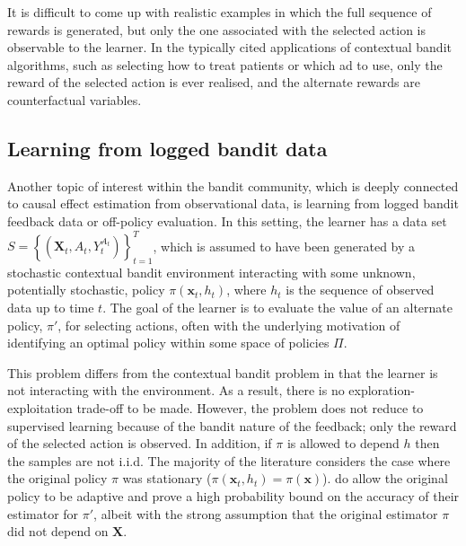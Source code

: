 \documentclass[11pt,a4paper,twoside]{report}
\newcommand{\set}[1]{\left\{#1\right\}}
\newcommand{\cfb}[2]{{#1}_t^{#2}} %
\renewcommand{\vec}[1]{\boldsymbol{#1}}
\theoremstyle{plain}
\theoremstyle{definition}
\begin{document}
It is difficult to come up with realistic examples in which the full sequence of rewards is generated, but only the one associated with the selected action is observable to the learner. In the typically cited applications of contextual bandit algorithms, such as selecting how to treat patients or which ad to use, only the reward of the selected action is ever realised, and the alternate rewards are counterfactual variables.

\subsection{Learning from logged bandit data}
\label{sec:off-policy-evaluation}
Another topic of interest within the bandit community, which is deeply connected to causal effect estimation from observational data, is learning from logged bandit feedback data or off-policy evaluation\citep{Langford2008a,strehl2010learning,Li2010,Dudik2011,Bottou2013,Swaminathan2015}. In this setting, the learner has a data set $S = \set{(\vec{X}_t,A_t,\cfb{Y}{A_t})}_{t=1}^T$, which is assumed to have been generated by a stochastic contextual bandit environment interacting with some unknown, potentially stochastic, policy $\pi(\vec{x}_t,h_t)$, where $h_t$ is the sequence of observed data up to time $t$. The goal of the learner is to evaluate the value of an alternate policy, $\pi'$, for selecting actions, often with the underlying motivation of identifying an optimal policy within some space of policies $\Pi$. 

This problem differs from the contextual bandit problem in that the learner is not interacting with the environment. As a result, there is no exploration-exploitation trade-off to be made. However, the problem does not reduce to supervised learning because of the bandit nature of the feedback; only the reward of the selected action is observed. In addition, if $\pi$ is allowed to depend $h$ then the samples are not i.i.d. The majority of the literature considers the case where the original policy $\pi$ was stationary ($\pi(\vec{x}_t,h_t) = \pi(\vec{x})$). \citet{Langford2008a} do allow the original policy to be adaptive and prove a high probability bound on the accuracy of their estimator for $\pi'$, albeit with the strong assumption that the original estimator $\pi$ did not depend on $\vec{X}$. 
\end{document}
